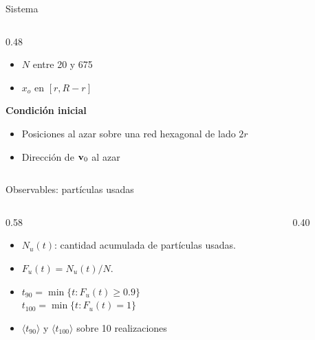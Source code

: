 \documentclass[aspectratio=169]{beamer}
\begin{document}
\begin{frame}{Sistema}
\begin{columns}[c]
\begin{column}{0.48\textwidth}
\begin{itemize}
        \item $N$ entre 20 y 675
        \item $x_o$ en $[r, R - r]$
      \end{itemize}
      \vspace{0.3em}
      \textbf{Condición inicial}
      \begin{itemize}\setlength{\itemsep}{2pt}
        \item Posiciones al azar sobre una red hexagonal de lado $2r$
        \item Dirección de $\mathbf{v}_0$ al azar
      \end{itemize}
    \end{column}
  \end{columns}
\end{frame}

\begin{frame}{Observables: partículas usadas}
  \begin{columns}[c]
    \begin{column}{0.58\textwidth}
      \begin{itemize}\setlength{\itemsep}{0.8em}
        \item $N_u(t)$: cantidad acumulada de partículas usadas.
        \item $F_u(t) = N_u(t)/N$.
        \item $t_{90} = \min\{t : F_u(t) \ge 0.9\}$\\[0.2em]
          $t_{100} = \min\{t : F_u(t) = 1\}$
        \item $\langle t_{90}\rangle$ y $\langle t_{100}\rangle$ sobre 10 realizaciones
      \end{itemize}
    \end{column}
    \begin{column}{0.40\textwidth}
      \centering
    \end{column}
  \end{columns}
\end{frame}
\end{document}
